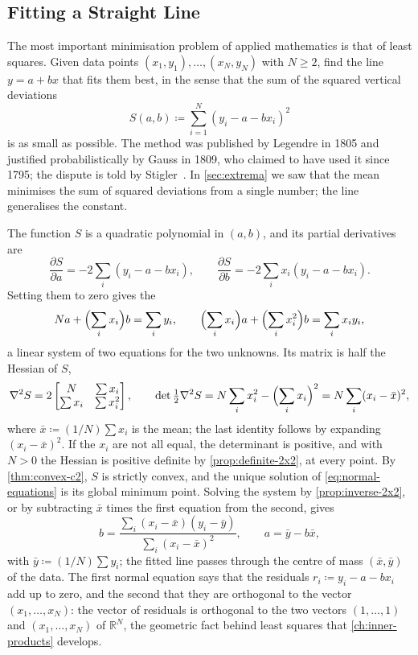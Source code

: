 \subsection{Fitting a Straight Line}

The most important minimisation problem of applied mathematics is that of least squares. Given data points $(x_1,y_1),\ldots,(x_N,y_N)$ with $N\ge2$, find the line $y=a+bx$ that fits them best, in the sense that the sum of the squared vertical deviations
\[
S(a,b)\coloneqq\sum_{i=1}^N(y_i-a-bx_i)^2
\]
is as small as possible. The method was published by Legendre in 1805 and justified probabilistically by Gauss in 1809, who claimed to have used it since 1795; the dispute is told by Stigler~\cite{legendre1805,gauss1809,stigler1981}. In \cref{sec:extrema} we saw that the mean minimises the sum of squared deviations from a single number; the line generalises the constant.

The function $S$ is a quadratic polynomial in $(a,b)$, and its partial derivatives are
\[
\frac{\partial S}{\partial a}=-2\sum_i(y_i-a-bx_i),\qquad\frac{\partial S}{\partial b}=-2\sum_ix_i(y_i-a-bx_i).
\]
Setting them to zero gives the 
\begin{equation}
Na+\Bigl(\sum_ix_i\Bigr)b=\sum_iy_i,\qquad\Bigl(\sum_ix_i\Bigr)a+\Bigl(\sum_ix_i^2\Bigr)b=\sum_ix_iy_i ,
\label{eq:normal-equations}
\end{equation}
a linear system of two equations for the two unknowns. Its matrix is half the Hessian of $S$,
\[
\nabla^2S=2\begin{bmatrix}N&\sum x_i\\\sum x_i&\sum x_i^2\end{bmatrix},\qquad\det\tfrac12\nabla^2S=N\sum_ix_i^2-\Bigl(\sum_ix_i\Bigr)^2=N\sum_i(x_i-\bar x)^2 ,
\]
where $\bar x\coloneqq(1/N)\sum x_i$ is the mean; the last identity follows by expanding $(x_i-\bar x)^2$. If the $x_i$ are not all equal, the determinant is positive, and with $N>0$ the Hessian is positive definite by \cref{prop:definite-2x2}, at every point. By \cref{thm:convex-c2}, $S$ is strictly convex, and the unique solution of \eqref{eq:normal-equations} is its global minimum point. Solving the system by \cref{prop:inverse-2x2}, or by subtracting $\bar x$ times the first equation from the second, gives
\[
b=\frac{\sum_i(x_i-\bar x)(y_i-\bar y)}{\sum_i(x_i-\bar x)^2},\qquad a=\bar y-b\bar x ,
\]
with $\bar y\coloneqq(1/N)\sum y_i$; the fitted line passes through the centre of mass $(\bar x,\bar y)$ of the data. The first normal equation says that the residuals $r_i\coloneqq y_i-a-bx_i$ add up to zero, and the second that they are orthogonal to the vector $(x_1,\ldots,x_N)$: the vector of residuals is orthogonal to the two vectors $(1,\ldots,1)$ and $(x_1,\ldots,x_N)$ of $\mathbb R^N$, the geometric fact behind least squares that \cref{ch:inner-products} develops.

